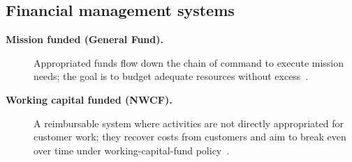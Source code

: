 \documentclass[../main.tex]{subfiles}
\begin{document}

\subsection{Financial management systems}
\begin{description}
  \item[\textbf{Mission funded (General Fund).}] Appropriated funds flow down the chain of command to execute mission needs; the goal is to budget adequate resources without excess~\autocite{edo-3-1-5-field-activity-fm-2025}.
  \item[\textbf{Working capital funded (NWCF).}] A reimbursable system where activities are not directly appropriated for customer work; they recover costs from customers and aim to break even over time under working-capital-fund policy~\autocite{edo-3-1-5-field-activity-fm-2025,USC-2208-NWCF,DoDFMR-Vol11B-Ch1}.
\end{description}

\end{document}
